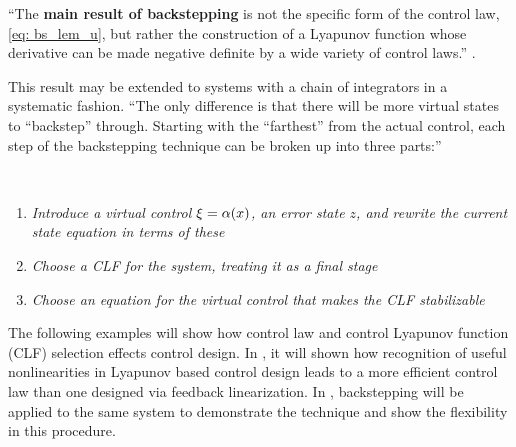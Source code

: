 \documentclass[12pt]{ucthesis}
\begin{document}
``The \textbf{main result of backstepping} is not the specific form of the control law, \autoref{eq: bs_lem_u}, but rather the construction of a Lyapunov function whose derivative can be made negative definite by a wide variety of control laws.'' \citet{Krstic95}.

This result may be extended to systems with a chain of integrators in a systematic fashion. ``The only difference is that there will be more virtual states to ``backstep'' through. Starting with the ``farthest'' from the actual control, each step of the backstepping technique can be broken up into three parts:'' \citet{Sonneveldt2007}
\begin{defn}~\\
\vspace{-2em}
	\begin{enumerate}[labelindent=\parindent,leftmargin=\parindent,noitemsep,nosep]
		\item \textit{Introduce a virtual control $\xi = \alpha(x)$, an error state $z$, and rewrite the current state equation in terms of these}
		\item \textit{Choose a CLF for the system, treating it as a final stage}
		\item \textit{Choose an equation for the virtual control that makes the CLF stabilizable}
	\end{enumerate} 
\end{defn}

The following examples will show how control law and control Lyapunov function (CLF) selection effects control design. In , it will shown how recognition of useful nonlinearities in Lyapunov based control design leads to a more efficient control law than one designed via feedback linearization. In , backstepping will be applied to the same system to demonstrate the technique and show the flexibility in this procedure.
\end{document}
